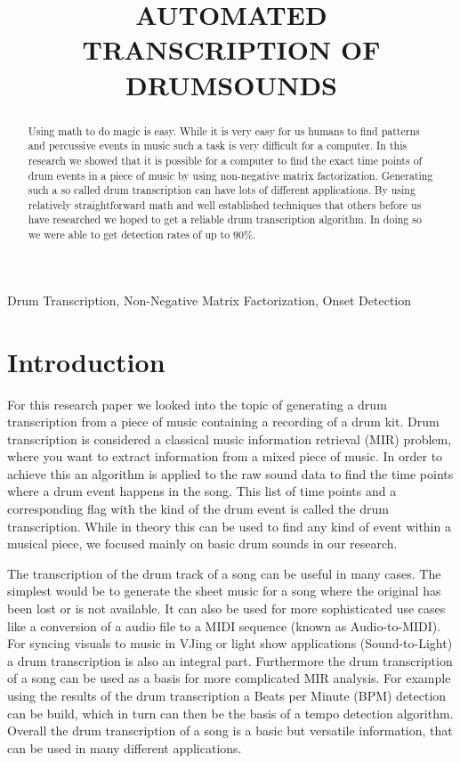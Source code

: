 \documentclass{article}
\title{AUTOMATED TRANSCRIPTION OF DRUMSOUNDS}
\begin{document}
%
\maketitle
%
\begin{abstract}
Using math to do magic is easy.
While it is very easy for us humans to find patterns and percussive events in music such a task is very difficult for a computer.
In this research we showed that it is possible for a computer to find the exact time points of drum events in a piece of music by using non-negative matrix factorization.
Generating such a so called drum transcription can have lots of different applications.
By using relatively straightforward math and well established techniques that others before us have researched we hoped to get a reliable drum transcription algorithm.
In doing so we were able to get detection rates of up to 90\%.

\end{abstract}
%
\begin{keywords}
Drum Transcription, Non-Negative Matrix Factorization, Onset Detection%
\end{keywords}
%
\section{Introduction}
\label{sec:intro}

For this research paper we looked into the topic of generating a drum transcription from a piece of music containing a recording of a drum kit.
Drum transcription is considered a classical music information retrieval (MIR) problem, where you want to extract information from a mixed piece of music.
In order to achieve this an algorithm is applied to the raw sound data to find the time points where a drum event happens in the song.
This list of time points and a corresponding flag with the kind of the drum event is called the drum transcription. 
While in theory this can be used to find any kind of event within a musical piece, we focused mainly on basic drum sounds in our research.

The transcription of the drum track of a song can be useful in many cases.
The simplest would be to generate the sheet music for a song where the original has been lost or is not available.
It can also be used for more sophisticated use cases like a conversion of a audio file to a MIDI sequence (known as Audio-to-MIDI).
For syncing visuals to music in VJing or light show applications (Sound-to-Light) a drum transcription is also an integral part.
Furthermore the drum transcription of a song can be used as a basis for more complicated MIR analysis.
For example using the results of the drum transcription a Beats per Minute (BPM) detection can be build, which in turn can then be the basis of a tempo detection algorithm.
Overall the drum transcription of a song is a basic but versatile information, that can be used in many different applications.
\end{document}
